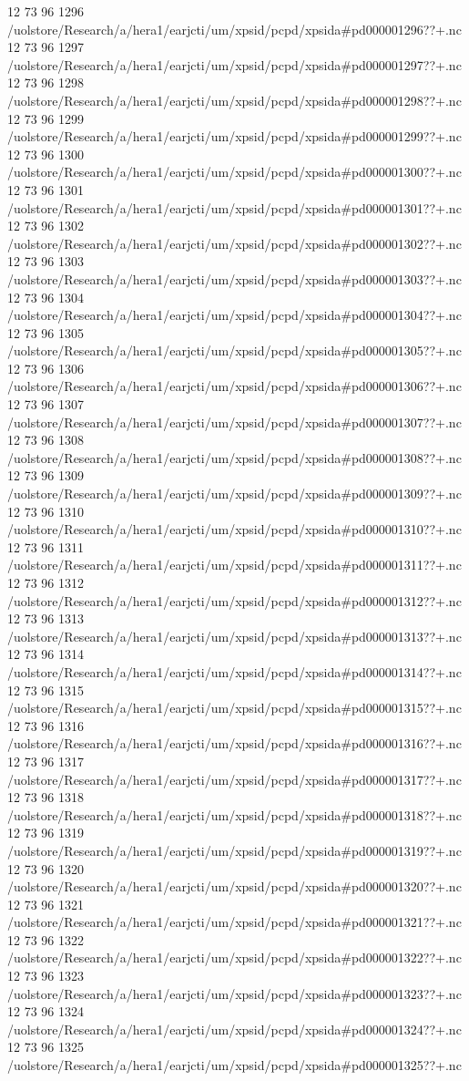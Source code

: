 12 73 96
1296
/uolstore/Research/a/hera1/earjcti/um/xpsid/pcpd/xpsida#pd000001296??+.nc
12 73 96
1297
/uolstore/Research/a/hera1/earjcti/um/xpsid/pcpd/xpsida#pd000001297??+.nc
12 73 96
1298
/uolstore/Research/a/hera1/earjcti/um/xpsid/pcpd/xpsida#pd000001298??+.nc
12 73 96
1299
/uolstore/Research/a/hera1/earjcti/um/xpsid/pcpd/xpsida#pd000001299??+.nc
12 73 96
1300
/uolstore/Research/a/hera1/earjcti/um/xpsid/pcpd/xpsida#pd000001300??+.nc
12 73 96
1301
/uolstore/Research/a/hera1/earjcti/um/xpsid/pcpd/xpsida#pd000001301??+.nc
12 73 96
1302
/uolstore/Research/a/hera1/earjcti/um/xpsid/pcpd/xpsida#pd000001302??+.nc
12 73 96
1303
/uolstore/Research/a/hera1/earjcti/um/xpsid/pcpd/xpsida#pd000001303??+.nc
12 73 96
1304
/uolstore/Research/a/hera1/earjcti/um/xpsid/pcpd/xpsida#pd000001304??+.nc
12 73 96
1305
/uolstore/Research/a/hera1/earjcti/um/xpsid/pcpd/xpsida#pd000001305??+.nc
12 73 96
1306
/uolstore/Research/a/hera1/earjcti/um/xpsid/pcpd/xpsida#pd000001306??+.nc
12 73 96
1307
/uolstore/Research/a/hera1/earjcti/um/xpsid/pcpd/xpsida#pd000001307??+.nc
12 73 96
1308
/uolstore/Research/a/hera1/earjcti/um/xpsid/pcpd/xpsida#pd000001308??+.nc
12 73 96
1309
/uolstore/Research/a/hera1/earjcti/um/xpsid/pcpd/xpsida#pd000001309??+.nc
12 73 96
1310
/uolstore/Research/a/hera1/earjcti/um/xpsid/pcpd/xpsida#pd000001310??+.nc
12 73 96
1311
/uolstore/Research/a/hera1/earjcti/um/xpsid/pcpd/xpsida#pd000001311??+.nc
12 73 96
1312
/uolstore/Research/a/hera1/earjcti/um/xpsid/pcpd/xpsida#pd000001312??+.nc
12 73 96
1313
/uolstore/Research/a/hera1/earjcti/um/xpsid/pcpd/xpsida#pd000001313??+.nc
12 73 96
1314
/uolstore/Research/a/hera1/earjcti/um/xpsid/pcpd/xpsida#pd000001314??+.nc
12 73 96
1315
/uolstore/Research/a/hera1/earjcti/um/xpsid/pcpd/xpsida#pd000001315??+.nc
12 73 96
1316
/uolstore/Research/a/hera1/earjcti/um/xpsid/pcpd/xpsida#pd000001316??+.nc
12 73 96
1317
/uolstore/Research/a/hera1/earjcti/um/xpsid/pcpd/xpsida#pd000001317??+.nc
12 73 96
1318
/uolstore/Research/a/hera1/earjcti/um/xpsid/pcpd/xpsida#pd000001318??+.nc
12 73 96
1319
/uolstore/Research/a/hera1/earjcti/um/xpsid/pcpd/xpsida#pd000001319??+.nc
12 73 96
1320
/uolstore/Research/a/hera1/earjcti/um/xpsid/pcpd/xpsida#pd000001320??+.nc
12 73 96
1321
/uolstore/Research/a/hera1/earjcti/um/xpsid/pcpd/xpsida#pd000001321??+.nc
12 73 96
1322
/uolstore/Research/a/hera1/earjcti/um/xpsid/pcpd/xpsida#pd000001322??+.nc
12 73 96
1323
/uolstore/Research/a/hera1/earjcti/um/xpsid/pcpd/xpsida#pd000001323??+.nc
12 73 96
1324
/uolstore/Research/a/hera1/earjcti/um/xpsid/pcpd/xpsida#pd000001324??+.nc
12 73 96
1325
/uolstore/Research/a/hera1/earjcti/um/xpsid/pcpd/xpsida#pd000001325??+.nc
